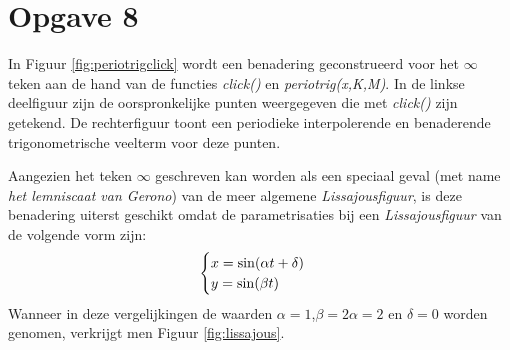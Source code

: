 \documentclass[a4paper]{article}
\newcommand{\opgave}[1]{\section*{Opgave #1}}
\begin{document}
\opgave{8}
In Figuur \ref{fig:periotrigclick} wordt een benadering geconstrueerd voor het $\infty$ teken aan de hand van de functies \textit{click()} en \textit{periotrig(x,K,M)}. In de linkse deelfiguur zijn de oorspronkelijke punten weergegeven die met \textit{click()} zijn getekend. De rechterfiguur toont een periodieke interpolerende en benaderende trigonometrische veelterm voor deze punten.

Aangezien het teken $\infty$ geschreven kan worden als een speciaal geval (met name \textit{het lemniscaat van Gerono}) van de meer algemene \textit{Lissajousfiguur}, is deze benadering uiterst geschikt omdat de parametrisaties bij een \textit{Lissajousfiguur} van de volgende vorm zijn:
\begin{equation}
    \centering
        \begin{cases}
            x=\sin (\alpha t+\delta)\\
            y=\sin (\beta t)
        \end{cases}
\end{equation}
Wanneer in deze vergelijkingen de waarden $\alpha=1$,$\beta=2\alpha=2$ en $\delta=0$ worden genomen, verkrijgt men Figuur \ref{fig:lissajous}.
\end{document}
